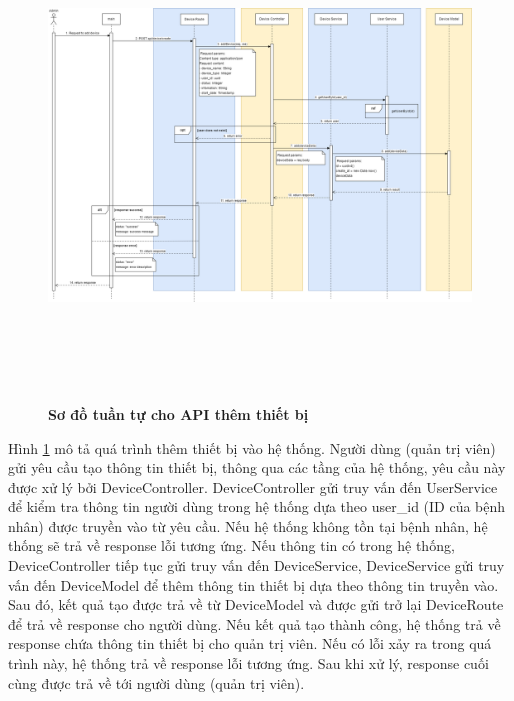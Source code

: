 \begin{figure}[H]
  \centering
  \includegraphics[width=16cm,height=13cm]{Images/sequence_api/addDevice.png}
  \caption[Sơ đồ tuần tự cho API thêm thiết bị]{\bfseries \fontsize{12pt}{0pt}
  \selectfont Sơ đồ tuần tự cho API thêm thiết bị }
  \label{addDevice} %
\end{figure}
Hình \ref{addDevice} mô tả quá trình thêm thiết bị vào hệ thống. Người dùng (quản trị viên) gửi yêu cầu tạo thông tin thiết bị, thông qua các tầng của hệ thống, 
yêu cầu này được xử lý bởi DeviceController. DeviceController gửi truy vấn đến UserService để kiểm tra thông tin người dùng trong hệ thống dựa theo user\_id (ID của bệnh nhân) được truyền vào từ yêu cầu. 
Nếu hệ thống không tồn tại bệnh nhân, hệ thống sẽ trả về response lỗi tương ứng. Nếu thông tin có trong hệ thống, DeviceController tiếp tục gửi truy vấn đến DeviceService, DeviceService gửi truy vấn đến DeviceModel để thêm thông tin thiết bị 
dựa theo thông tin truyền vào. Sau đó, kết quả tạo được trả về từ DeviceModel và được gửi trở lại DeviceRoute để trả về response cho người dùng. Nếu kết quả tạo thành công, hệ thống trả về response chứa thông tin thiết bị cho quản trị viên. 
Nếu có lỗi xảy ra trong quá trình này, hệ thống trả về response lỗi tương ứng. Sau khi xử lý, response cuối cùng được trả về tới người dùng (quản trị viên).

